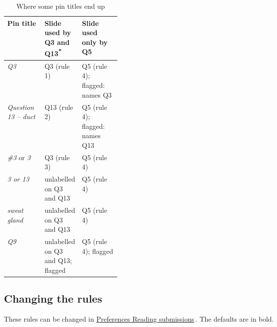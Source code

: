 \begin{table}[H]\centering
\begin{tabularx}{\linewidth}{@{}l>{\raggedright\arraybackslash}p{0.27\linewidth}Y@{}}
\toprule
\textbf{Pin title} & \textbf{Slide used by Q3 and Q13}\textsuperscript{*} & \textbf{Slide used only by Q5} \\
\midrule
\emph{Q3} & Q3 (rule 1) & Q5 (rule 4); flagged: names Q3 \\
\emph{Question 13 -- duct} & Q13 (rule 2) & Q5 (rule 4); flagged: names Q13 \\
\emph{\#3} or \emph{3} & Q3 (rule 3) & Q5 (rule 4) \\
\emph{3 or 13} & unlabelled  on Q3 and Q13 & Q5 (rule 4) \\
\emph{sweat gland} & unlabelled  on Q3 and Q13 & Q5 (rule 4) \\
\emph{Q9} & unlabelled  on Q3 and Q13; flagged & Q5 (rule 4); flagged \\
\bottomrule
\end{tabularx}
\par{}
\caption{Where some pin titles end up}\label{tab:titles}
\end{table}

\subsection*{Changing the rules}

These rules can be changed in \href{https://github.com/agadin/micro-speed-grader/blob/main/docs/help/preferences.md\#reading-submissions}{Preferences \menuarrow{} Reading submissions}\,\onlinemark{}. The defaults are in bold.

